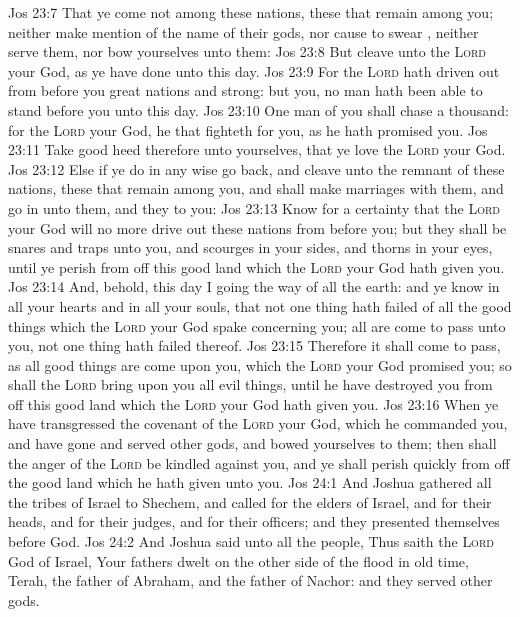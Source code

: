 \vs Jos 23:7 That ye come not among these nations, these that remain among you; neither make mention of the name of their gods, nor cause to swear , neither serve them, nor bow yourselves unto them:
\vs Jos 23:8 But cleave unto the \textsc{Lord} your God, as ye have done unto this day.
\vs Jos 23:9 For the \textsc{Lord} hath driven out from before you great nations and strong: but  you, no man hath been able to stand before you unto this day.
\vs Jos 23:10 One man of you shall chase a thousand: for the \textsc{Lord} your God, he  that fighteth for you, as he hath promised you.
\vs Jos 23:11 Take good heed therefore unto yourselves, that ye love the \textsc{Lord} your God.
\vs Jos 23:12 Else if ye do in any wise go back, and cleave unto the remnant of these nations,  these that remain among you, and shall make marriages with them, and go in unto them, and they to you:
\vs Jos 23:13 Know for a certainty that the \textsc{Lord} your God will no more drive out  these nations from before you; but they shall be snares and traps unto you, and scourges in your sides, and thorns in your eyes, until ye perish from off this good land which the \textsc{Lord} your God hath given you.
\vs Jos 23:14 And, behold, this day I  going the way of all the earth: and ye know in all your hearts and in all your souls, that not one thing hath failed of all the good things which the \textsc{Lord} your God spake concerning you; all are come to pass unto you,  not one thing hath failed thereof.
\vs Jos 23:15 Therefore it shall come to pass,  as all good things are come upon you, which the \textsc{Lord} your God promised you; so shall the \textsc{Lord} bring upon you all evil things, until he have destroyed you from off this good land which the \textsc{Lord} your God hath given you.
\vs Jos 23:16 When ye have transgressed the covenant of the \textsc{Lord} your God, which he commanded you, and have gone and served other gods, and bowed yourselves to them; then shall the anger of the \textsc{Lord} be kindled against you, and ye shall perish quickly from off the good land which he hath given unto you.
\vs Jos 24:1 And Joshua gathered all the tribes of Israel to Shechem, and called for the elders of Israel, and for their heads, and for their judges, and for their officers; and they presented themselves before God.
\vs Jos 24:2 And Joshua said unto all the people, Thus saith the \textsc{Lord} God of Israel, Your fathers dwelt on the other side of the flood in old time,  Terah, the father of Abraham, and the father of Nachor: and they served other gods.
